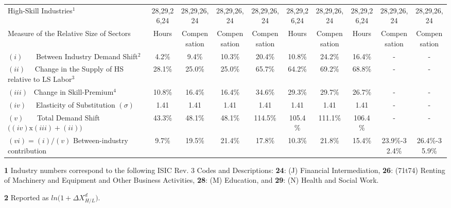 \documentclass[10pt]{article}
\begin{document}
\begin{landscape}
\begin{table}[h!]
\begin{threepartable}
{\begin{tabular}{l| c c c c c c c  | c c  }
High-Skill Industries$^{1}$                               				& 28,29,26,24 & 28,29,26,24 & 28,29,26,24 & 28,29,26,24 & 28,29,26,24 & 28,29,26,24  & 28,29,26,24 & 28,29,26,24 & 28,29,26,24 \\
Measure of the Relative Size of Sectors                                 & Hours      & Compensation & Compensation & Compensation & Hours     & Compensation  & Hours & Compensation & Compensation  \\ \hline
$(i)$ \ \ \ Between Industry Demand Shift$^{2}$                         & 4.2\%      & 9.4\%      & 10.3\%      & 20.4\%      & 10.8\%        & 24.2\%        & 16.4\%        & -            & -             \\
$(ii)$ \ \  Change in the Supply of HS relative to LS Labor$^{3}$       & 28.1\%     & 25.0\%     & 25.0\%      & 65.7\%      & 64.2\%        & 69.2\%        & 68.8\%        & -            & -             \\
$(iii)$ \   Change in Skill-Premium$^{4}$                               & 10.8\%     & 16.4\%     & 16.4\%      & 34.6\%      & 29.3\%        & 29.7\%        & 26.7\%        & -            & -             \\
$(iv)$  \ \ Elasticity of Substitution $(\sigma)$                       & 1.41       & 1.41       & 1.41        & 1.41        & 1.41          & 1.41          & 1.41          & -            & -             \\ 
$(v)$ \ \ \ Total Demand Shift $\big( (iv) \text{x} (iii) + (ii) \big)$ & 43.3\%     & 48.1\%     & 48.1\%      & 114.5\%     & 105.4\%       & 111.1\%       & 106.4\%       & -            & -             \\\hline
$(vi) = (i)/(v)$ Between-industry contribution                          & 9.7\%      & 19.5\%     & 21.4\%      & 17.8\%      &  10.3\%       & 21.8\%        & 15.4\%    & 23.9\%-32.4\%    & 26.4\%-35.9\% \\\hline \hline
\end{tabular}
}
\begin{tablenotes} \scriptsize
\item{\textbf{1}}  Industry numbers correspond to the following ISIC Rev. 3 Codes and Descriptions: \textbf{24}: (J) Financial Intermediation, \textbf{26}: (71t74) Renting of Machinery and Equipment and Other Business Activities, \textbf{28}: (M) Education, and \textbf{29}: (N) Health and Social Work.\\
\item{\textbf{2}}  Reported as $ln\Big(1+\Delta X^{d}_{ H/L } \Big)$.\\

\end{tablenotes}
\end{threepartable}
\end{table}
\end{landscape}
\end{document}
